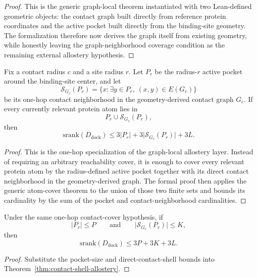 \begin{proof}
This is the generic graph-local theorem instantiated with two Lean-defined geometric objects: the contact graph built directly from reference protein coordinates and the active pocket built directly from the binding-site geometry. The formalization therefore now derives the graph itself from existing geometry, while honestly leaving the graph-neighborhood coverage condition as the remaining external allostery hypothesis.
\end{proof}

\begin{theorem}\label{thm:contact-shell-allostery}
Fix a contact radius $c$ and a site radius $r$. Let $P_r$ be the radius-$r$ active pocket around the binding-site center, and let
\[
\mathcal{S}_{G_c}(P_r)=
\{x : \exists y \in P_r,\ (x,y) \in E(G_c)\}
\]
be its one-hop contact neighborhood in the geometry-derived contact graph $G_c$. If every currently relevant protein atom lies in
\[
P_r \cup \mathcal{S}_{G_c}(P_r),
\]
then
\[
\mathrm{srank}(D_{\mathrm{dock}})
\le
3|P_r| + 3\bigl|\mathcal{S}_{G_c}(P_r)\bigr| + 3L.
\]
\end{theorem}

\begin{proof}
This is the one-hop specialization of the graph-local allostery layer. Instead of requiring an arbitrary reachability cover, it is enough to cover every relevant protein atom by the radius-defined active pocket together with its direct contact neighborhood in the geometry-derived graph. The formal proof then applies the generic atom-cover theorem to the union of those two finite sets and bounds its cardinality by the sum of the pocket and contact-neighborhood cardinalities.
\end{proof}

\begin{corollary}\label{cor:bounded-contact-shell-regime}
Under the same one-hop contact-cover hypothesis, if
\[
|P_r| \le P
\qquad\text{and}\qquad
\bigl|\mathcal{S}_{G_c}(P_r)\bigr| \le K,
\]
then
\[
\mathrm{srank}(D_{\mathrm{dock}})
\le
3P + 3K + 3L.
\]
\end{corollary}

\begin{proof}
Substitute the pocket-size and direct-contact-shell bounds into Theorem~\ref{thm:contact-shell-allostery}.
\end{proof}

